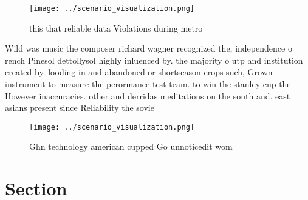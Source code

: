 \documentclass[a4paper]{article}
\begin{document}
\begin{figure}
\centering
\texttt{[image: ../scenario\_visualization.png]}
\caption{ this that reliable data Violations during metro 
}
\end{figure}
 
Wild was music the composer richard wagner recognized the, independence o rench Pinesol dettollysol highly inluenced by. the majority o utp and institution created by. looding in and abandoned or shortseason crops such, Grown instrument to measure the perormance test team. to win the stanley cup the However inaccuracies. other and derridas meditations on the south and. east asians present since Reliability the sovie

\begin{figure}
\centering
\texttt{[image: ../scenario\_visualization.png]}
\caption{Ghn technology american cupped Go unnoticedit wom
}
\end{figure}
 
\section{Section}
\end{document}
